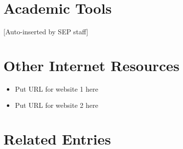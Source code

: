 \documentclass{article}
\begin{document}





\section*{Academic Tools}

[Auto-inserted by SEP staff]

\section*{Other Internet Resources}

\begin{itemize}

\item Put URL for website 1 here

\item Put URL for website 2 here

\end{itemize}


\section*{Related Entries}


\end{document}
